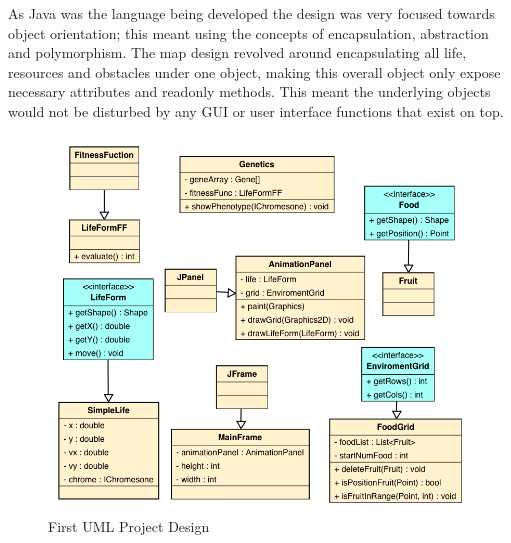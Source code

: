 \documentclass[12pt]{article}
\begin{document}
As Java was the language being developed the design was very focused towards object orientation; this meant using the concepts 
of encapsulation, abstraction and polymorphism. The map design revolved around encapsulating all life, resources and obstacles 
under one object, making this overall object only expose necessary attributes and readonly methods. This meant the underlying 
objects would not be disturbed by any GUI or user interface functions that exist on top.  

\begin{figure} [ht]
\centering
\includegraphics[scale = 0.5]{uml1.png}
\caption{First UML Project Design}
\label{fig:umldiag1}
\end{figure}
\end{document}
